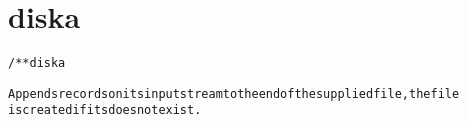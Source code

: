 \section{diska}
\begin{shaded}
\begin{alltt}
/** diska

Appends records on its input stream to the end of the supplied file, the file
is created if its does not exist.

\end{alltt}
\end{shaded}

